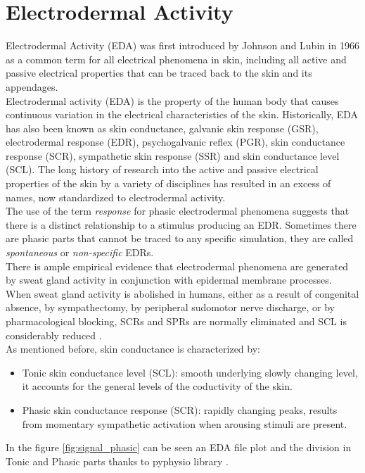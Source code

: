 \section{Electrodermal Activity}
Electrodermal Activity (EDA) was first introduced by Johnson and Lubin in 1966 \cite{johnson1996} as a common term for all electrical phenomena in skin, including all active and passive electrical properties that can be traced back to the skin and its appendages.
\\
Electrodermal activity (EDA) is the property of the human body that causes continuous variation in the electrical characteristics of the skin. Historically, EDA has also been known as skin conductance, galvanic skin response (GSR), electrodermal response (EDR), psychogalvanic reflex (PGR), skin conductance response (SCR), sympathetic skin response (SSR) and skin conductance level (SCL). The long history of research into the active and passive electrical properties of the skin by a variety of disciplines has resulted in an excess of names, now standardized to electrodermal activity.
\\ \indent
The use of the term \textit{response} for phasic electrodermal phenomena suggests that there is a distinct relationship to a stimulus producing an EDR. Sometimes there are phasic parts that cannot be traced to any specific simulation, they are called \textit{spontaneous} or \textit{non-specific} EDRs.
\\ \indent
There is ample empirical evidence that electrodermal phenomena are generated by sweat gland activity in conjunction with epidermal membrane processes. When sweat gland activity is abolished in humans, either as a result of congenital absence, by sympathectomy, by peripheral sudomotor nerve discharge, or by pharmacological blocking, SCRs and SPRs are normally eliminated and SCL is considerably reduced \cite{fowles1993electrodermal}.
\\ \indent
As mentioned before, skin conductance is characterized by:
\begin{itemize}
	\item Tonic skin conductance level (SCL): smooth underlying slowly changing level, it accounts for the general levels of the coductivity of the skin.
	\item Phasic skin conductance response (SCR): rapidly changing peaks, results from momentary sympathetic activation when arousing stimuli are present.
\end{itemize}
In the figure \ref{fig:signal_phasic} can be seen an EDA file plot and the division in Tonic and Phasic parts thanks to pyphysio library \cite{bizzego2019pyphysio}.
